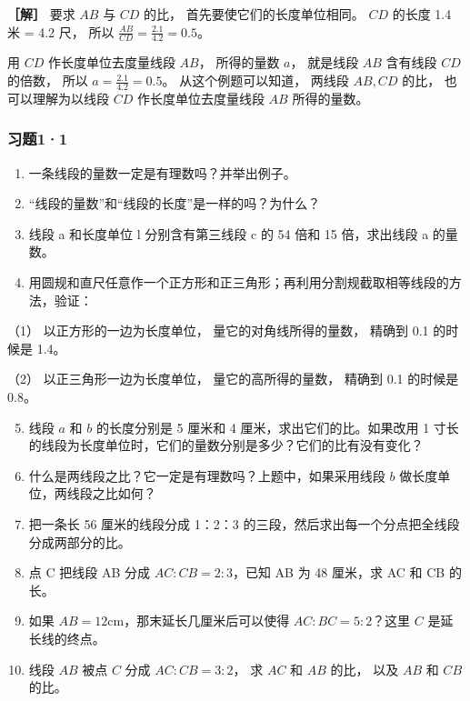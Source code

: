 \textbf{［解］} 要求 \(AB\) 与 \(CD\) 的比，
首先要使它们的长度单位相同。 \(CD\) 的长度 1.4 米 = 4.2 尺， 所以
\(\frac{AB}{CD} = \frac{2.1}{4.2} = 0.5\)。

用 \(CD\) 作长度单位去度量线段 \(AB\)， 所得的量数 \(a\)， 就是线段
\(AB\) 含有线段 \(CD\) 的倍数， 所以 \(a = \frac{2.1}{4.2} = 0.5\)。
从这个例题可以知道， 两线段 \(AB, CD\) 的比， 也可以理解为以线段 \(CD\)
作长度单位去度量线段 \(AB\) 所得的量数。

\subsubsection{习题1·1}

\begin{enumerate}
\item
  一条线段的量数一定是有理数吗？并举出例子。
\item
  ``线段的量数''和``线段的长度''是一样的吗？为什么？
\item
  线段 a 和长度单位 l 分别含有第三线段 c 的 54 倍和 15 倍，求出线段 a
  的量数。
\item
  用圆规和直尺任意作一个正方形和正三角形；再利用分割规截取相等线段的方法，验证：
\end{enumerate}

（1） 以正方形的一边为长度单位， 量它的对角线所得的量数， 精确到 0.1
的时候是 1.4。

（2） 以正三角形一边为长度单位， 量它的高所得的量数， 精确到 0.1
的时候是 0.8。

\begin{enumerate}
\setcounter{enumi}{4}
\item
  线段 \(a\) 和 \(b\) 的长度分别是 5 厘米和 4
  厘米，求出它们的比。如果改用 1
  寸长的线段为长度单位时，它们的量数分别是多少？它们的比有没有变化？
\item
  什么是两线段之比？它一定是有理数吗？上题中，如果采用线段 \(b\)
  做长度单位，两线段之比如何？
\item
  把一条长 56 厘米的线段分成 1：2：3
  的三段，然后求出每一个分点把全线段分成两部分的比。
\item
  点 C 把线段 AB 分成 \(AC:CB=2:3\)，已知 AB 为 48 厘米，求 AC 和 CB
  的长。
\item
  如果 \(AB = 12\mathrm{cm}\)，那末延长几厘米后可以使得
  \(AC:BC = 5:2\)？这里 \(C\) 是延长线的终点。
\item
  线段 \(AB\) 被点 \(C\) 分成 \(AC:CB=3:2\)， 求 \(AC\) 和 \(AB\) 的比，
  以及 \(AB\) 和 \(CB\) 的比。
\end{enumerate}

